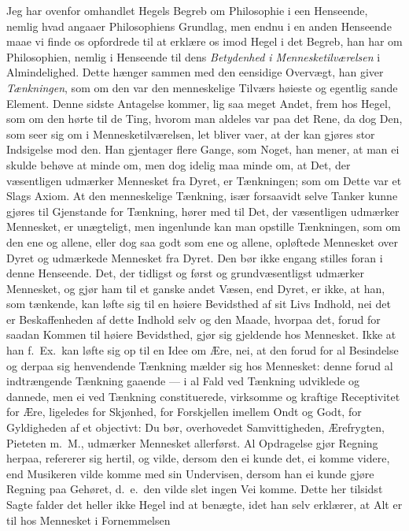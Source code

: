 \documentclass[12pt,a4paper]{book}
\newcommand{\apage}[1]{\marginnote{\footnotesize\textit{[#1]}}}
\begin{document}
Jeg har ovenfor omhandlet Hegels Begreb om Philosophie i een Henseende,
nemlig hvad angaaer Philosophiens Grundlag, men endnu i en anden Henseende
maae vi finde os opfordrede til at erklære os imod Hegel i det Begreb, han
har om Philosophien, nemlig i Henseende til dens \emph{Betydenhed i
Mennesketilværelsen} i Almindelighed. Dette hænger sammen med den eensidige
Overvægt, han giver \emph{Tænkningen}, som om den var den menneskelige Tilværs
høieste og egentlig sande Element. Denne sidste Antagelse kommer, lig saa
meget Andet, frem hos Hegel, som om den hørte til de Ting, hvorom man
aldeles var paa det Rene, da dog Den, som seer sig om i Mennesketilværelsen,
let bliver vaer, at der kan gjøres stor Indsigelse mod den. Han gjentager
flere Gange, som Noget, han mener, at man ei skulde behøve at minde om, men
dog idelig maa minde om, at Det, der væsentligen udmærker Mennesket fra
Dyret, er Tænkningen; som om Dette var et Slags Axiom. At den menneskelige
Tænkning, især forsaavidt selve Tanker kunne gjøres til Gjenstande for
Tænkning, hører med til Det, der væsentligen udmærker Mennesket, er
unægteligt, men ingenlunde kan man opstille Tænkningen, som om den ene og
allene, eller dog saa godt som ene og allene, opløftede Mennesket over
Dyret og udmærkede Mennesket fra Dyret. Den bør ikke engang stilles foran i
denne Henseende. Det, der tidligst og først og grundvæsentligst udmærker
Mennesket, og gjør ham til et ganske andet Væsen, end Dyret, er ikke, at
han, som tænkende, kan løfte sig til en høiere Bevidsthed af sit Livs
Indhold, nei det er Beskaffenheden af dette Indhold selv og den Maade,
hvorpaa det, forud for saadan Kommen til høiere \apage{94} Bevidsthed, gjør sig
gjeldende hos Mennesket. Ikke at han f.\ Ex.\ kan løfte sig op til en Idee
om Ære, nei, at den forud for al Besindelse og derpaa sig henvendende
Tænkning mælder sig hos Mennesket: denne forud al indtrængende Tænkning
gaaende --- i al Fald ved Tænkning udviklede og dannede, men ei ved
Tænkning constituerede, virksomme og kraftige Receptivitet for Ære,
ligeledes for Skjønhed, for Forskjellen imellem Ondt og Godt, for
Gyldigheden af et objectivt: Du bør, overhovedet Samvittigheden,
Ærefrygten, Pieteten m.\ M., udmærker Mennesket allerførst. Al Opdragelse
gjør Regning herpaa, refererer sig hertil, og vilde, dersom den ei kunde
det, ei komme videre, end Musikeren vilde komme med sin Undervisen, dersom
han ei kunde gjøre Regning paa Gehøret, d.\ e.\ den vilde slet ingen Vei
komme. Dette her tilsidst Sagte falder det heller ikke Hegel ind at
benægte, idet han selv erklærer, at Alt er til hos Mennesket i Fornemmelsen
\end{document}
